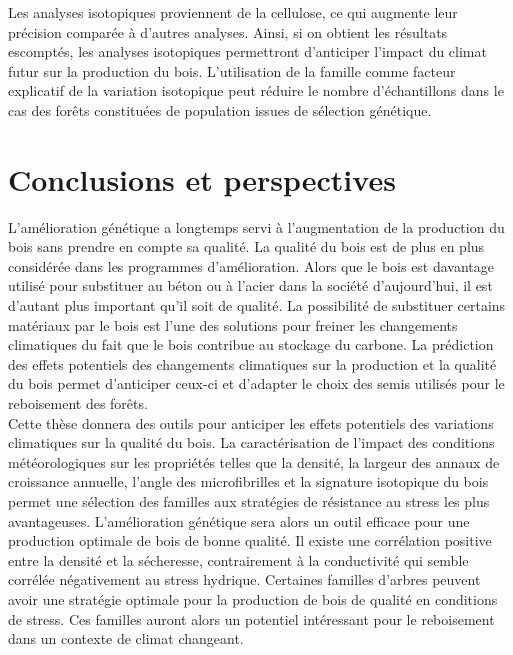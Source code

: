 \documentclass{report}
\begin{document}
Les analyses isotopiques proviennent de la cellulose, ce qui augmente leur précision comparée à d'autres analyses. Ainsi, si on obtient les résultats escomptés, les analyses isotopiques permettront d'anticiper l'impact du climat futur sur la production du bois. L'utilisation de la famille comme facteur explicatif de la variation isotopique peut réduire le nombre d'échantillons dans le cas des forêts constituées de population issues de sélection génétique. %

\clearpage %

\chapter*{Conclusions et perspectives}

L'amélioration génétique a longtemps servi à l'augmentation de la production du bois sans prendre en compte sa qualité. La qualité du bois est de plus en plus considérée dans les programmes d'amélioration. Alors que le bois est davantage utilisé pour substituer au  béton ou à l'acier dans la société d'aujourd'hui, il est d'autant plus important qu'il soit de qualité. La possibilité de substituer certains matériaux par le bois est l'une des solutions pour freiner les changements climatiques du fait que le bois contribue au stockage du carbone. La prédiction des effets potentiels des changements climatiques sur la production et la qualité du bois permet d'anticiper ceux-ci et d'adapter le choix des semis utilisés pour le reboisement des forêts. \\

Cette thèse donnera des outils pour anticiper les effets potentiels des variations climatiques sur la qualité du bois. La caractérisation de l'impact des conditions météorologiques sur les propriétés telles que la densité, la largeur des annaux de croissance annuelle, l'angle des microfibrilles et la signature isotopique du bois permet une sélection des familles aux stratégies de résistance au stress les plus avantageuses. L'amélioration génétique sera alors un outil efficace pour une production optimale de bois de bonne qualité. Il existe une corrélation positive entre la densité et la sécheresse, contrairement à la conductivité qui semble corrélée négativement au stress hydrique. Certaines familles d'arbres peuvent avoir une stratégie optimale pour la production de bois de qualité en conditions de stress. Ces familles auront alors un potentiel intéressant pour le reboisement dans un contexte de climat changeant. \\
\end{document}
